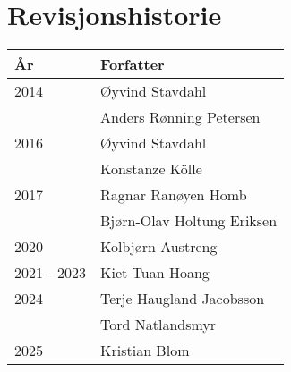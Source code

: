 \section*{Revisjonshistorie}
\begin{center}
 \begin{tabular}{|p{2.5cm} p{5.5cm}|} 
 \hline
 År & Forfatter \\ [0.5ex] 
 \hline\hline
 2014 & Øyvind Stavdahl\\
  & Anders Rønning Petersen\\
 \hline
 2016 & Øyvind Stavdahl\\
      & Konstanze Kölle\\
 \hline
 2017 & Ragnar Ranøyen Homb\\
      & Bjørn-Olav Holtung Eriksen\\
 \hline
 2020 & Kolbjørn Austreng  \\ 
 \hline
 2021 - 2023 & Kiet Tuan Hoang \\
 \hline
 2024 & Terje Haugland Jacobsson \\
      & Tord Natlandsmyr        \\
 \hline
 2025 & Kristian Blom \\
 \hline
\end{tabular}
\end{center}